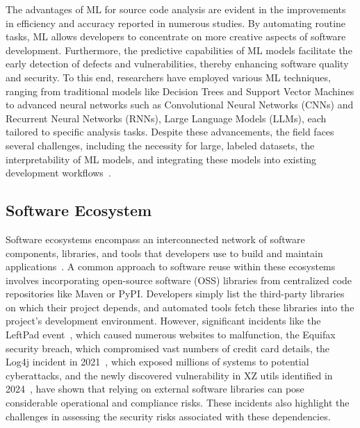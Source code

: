 The advantages of ML for source code analysis are evident in the improvements in efficiency and accuracy reported in numerous studies. By automating routine tasks, ML allows developers to concentrate on more creative aspects of software development. Furthermore, the predictive capabilities of ML models facilitate the early detection of defects and vulnerabilities, thereby enhancing software quality and security. To this end, researchers have employed various ML techniques, ranging from traditional models like Decision Trees and Support Vector Machines to advanced neural networks such as Convolutional Neural Networks (CNNs) and Recurrent Neural Networks (RNNs), Large Language Models (LLMs), each tailored to specific analysis tasks. Despite these advancements, the field faces several challenges, including the necessity for large, labeled datasets, the interpretability of ML models, and integrating these models into existing development workflows~\cite{gao2023interpretability}.

\subsection{Software Ecosystem}
Software ecosystems encompass an interconnected network of software components, libraries, and tools that developers use to build and maintain applications~\cite{mensbook}. A common approach to software reuse within these ecosystems involves incorporating open-source software (OSS) libraries from centralized code repositories like Maven or PyPI. Developers simply list the third-party libraries on which their project depends, and automated tools fetch these libraries into the project’s development environment. However, significant incidents like the LeftPad event~\cite{leftpad}, which caused numerous websites to malfunction, the Equifax security breach, which compromised vast numbers of credit card details, the Log4j incident in 2021~\cite{log4j}, which exposed millions of systems to potential cyberattacks, and the newly discovered vulnerability in XZ utils identified in 2024~\cite{xz}, have shown that relying on external software libraries can pose considerable operational and compliance risks. These incidents also highlight the challenges in assessing the security risks associated with these dependencies.


